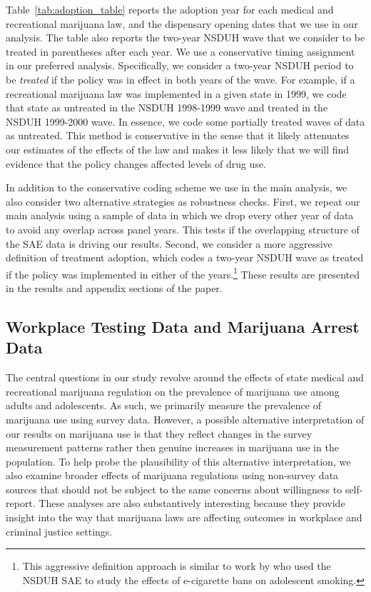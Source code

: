 \documentclass[12pt]{article}%
\begin{document}
Table~\ref{tab:adoption_table} reports the adoption year for each medical and recreational marijuana law, and the dispensary opening dates that we use in our analysis.  The table also reports the two-year NSDUH wave that we consider to be treated in parentheses after each year. We use a conservative timing assignment in our preferred analysis. Specifically, we consider a two-year NSDUH period to be \textit{treated} if the policy was in effect in both years of the wave. For example, if a recreational marijuana law was implemented in a given state in 1999, we code that state as untreated in the NSDUH 1998-1999 wave and treated in the NSDUH 1999-2000 wave. In essence, we code some partially treated waves of data as untreated. This method is conservative in the sense that it likely attenuates our estimates of the effects of the law and makes it less likely that we will find evidence that the policy changes affected levels of drug use. 



In addition to the conservative coding scheme we use in the main analysis, we also consider two alternative strategies as robustness checks. First, we repeat our main analysis using a sample of data in which we drop every other year of data to avoid any overlap across panel years. This tests if the overlapping structure of the SAE data is driving our results. Second, we consider a more aggressive definition of treatment adoption, which codes a two-year NSDUH wave as treated if the policy was implemented in either of the years.\footnote{This aggressive definition approach is similar to work by \citet{Friedman2015} who used the NSDUH SAE to study the effects of e-cigarette bans on adolescent smoking.} These results are presented in the results and appendix sections of the paper.

\subsection{Workplace Testing Data and Marijuana Arrest Data}

The central questions in our study revolve around the effects of state medical and recreational marijuana regulation on the prevalence of marijuana use among adults and adolescents. As such, we primarily measure the prevalence of marijuana use using survey data. However, a possible alternative interpretation of our results on marijuana use is that they reflect changes in the survey measurement patterns rather then genuine increases in marijuana use in the population. To help probe the plausibility of this alternative interpretation, we also examine broader effects of marijuana regulations using non-survey data sources that should not be subject to the same concerns about willingness to self-report. These analyses are also substantively interesting because they provide insight into the way that marijuana laws are affecting outcomes in workplace and criminal justice settings. 
\end{document}
